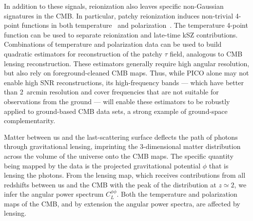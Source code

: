\documentclass[PICOReport.tex]{subfiles}
\begin{document}
In addition to these signals, reionization also leaves specific non-Gaussian signatures in the CMB.  In particular, patchy reionization induces non-trivial 4-point functions in both temperature~\citep{SmithFerraro2017} and polarization~\citep{DvorkinSmith2009}.  The temperature 4-point function can be used to separate reionization and late-time kSZ contributions.  Combinations of temperature and polarization data can be used to build quadratic estimators for reconstruction of the patchy $\tau$ field, analogous to CMB lensing reconstruction.  These estimators generally require high angular resolution, but also rely on foreground-cleaned CMB maps.  Thus, while PICO alone may not enable high \ac{SNR} reconstructions, its high-frequency bands --- which have better than 2~arcmin resolution and cover frequencies that are not suitable for observations from the ground --- will enable these estimators to be robustly applied to ground-based CMB data sets, a strong example of ground-space complementarity.  %
%

\vspace{0.1in}
 \hspace{0.1in} \label{gravitationallensing}
Matter between us and the last-scattering surface deflects the path of photons through gravitational lensing, imprinting the 3-dimensional matter distribution across the volume of the universe onto the CMB maps. The specific quantity being mapped by the data is the projected gravitational potential $\phi$ that is lensing the photons. From the lensing map, which
receives contributions from all redshifts between us and the CMB with the peak of the distribution at $z \simeq 2$, we infer the angular power spectrum $C_{L}^{\phi \phi}$. %
Both the temperature and polarization maps of the CMB, and by extension the angular power spectra, are affected by lensing. 
\end{document}
